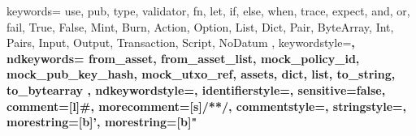  {
    keywords={
        use, pub, type, validator, fn, let, if, else, when, trace, expect, and, or, fail, True, False,
        Mint, Burn, Action, Option, List, Dict, Pair, ByteArray, Int, Pairs, Input, Output, Transaction, Script, NoDatum
    },
    keywordstyle=\color{blue}\bfseries,
    ndkeywords={
        from_asset, from_asset_list, mock_policy_id, mock_pub_key_hash, mock_utxo_ref, assets, dict, list, to_string, to_bytearray
    },
    ndkeywordstyle=\color{orange}\bfseries,
    identifierstyle=\color{black},
    sensitive=false,
    comment=[l]{\#},
    morecomment=[s]{/*}{*/},
    commentstyle=\color{gray}\ttfamily,
    stringstyle=\color{red}\ttfamily,
    morestring=[b]',
    morestring=[b]"
}




